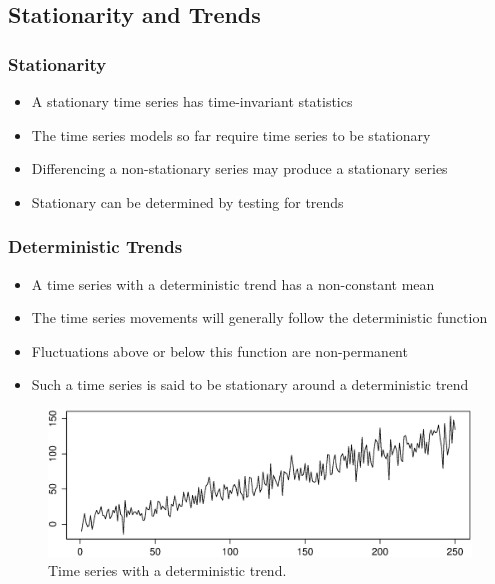\documentclass[presentation]{beamer}
\begin{document}
\subsection{Stationarity and Trends}

\begin{frame}[t]
\frametitle{Stationarity}
\begin{itemize}
\item{A stationary time series has time-invariant statistics}
\item{The time series models so far require time series to be stationary}
\item{Differencing a non-stationary series may produce a stationary series}
\item{Stationary can be determined by testing for trends}
\end{itemize}
\end{frame}

\begin{frame}[t]
\frametitle{Deterministic Trends}
\footnotesize{
\begin{itemize}
\item{A time series with a deterministic trend has a non-constant mean}
\item{The time series movements will generally follow the deterministic function}
\item{Fluctuations above or below this function are non-permanent}
\item{Such a time series is said to be stationary around a deterministic trend}
\end{itemize}
}
\begin{figure}[htbp]
\begin{center}
\includegraphics[width=\textwidth]{assets/deterministic_trend.eps}
\caption{Time series with a deterministic trend.}
\end{center}
\end{figure}
\end{frame}
\end{document}
